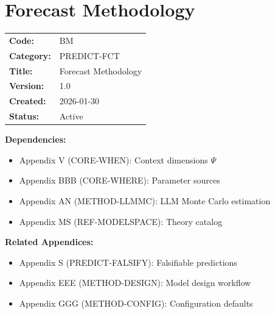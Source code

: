 
\chapter{Forecast Methodology}
\label{app:forecast-methodology}

\begin{tcolorbox}[colback=blue!5!white,colframe=blue!75!black,title=Appendix Metadata]
\begin{tabular}{ll}
\textbf{Code:} & BM \\
\textbf{Category:} & PREDICT-FCT \\
\textbf{Title:} & Forecast Methodology \\
\textbf{Version:} & 1.0 \\
\textbf{Created:} & 2026-01-30 \\
\textbf{Status:} & Active \\
\end{tabular}
\end{tcolorbox}

\begin{tcolorbox}[colback=gray!5!white,colframe=gray!75!black,title=Cross-Reference Map]
\textbf{Dependencies:}
\begin{itemize}
    \item Appendix V (CORE-WHEN): Context dimensions $\Psi$
    \item Appendix BBB (CORE-WHERE): Parameter sources
    \item Appendix AN (METHOD-LLMMC): LLM Monte Carlo estimation
    \item Appendix MS (REF-MODELSPACE): Theory catalog
\end{itemize}

\textbf{Related Appendices:}
\begin{itemize}
    \item Appendix S (PREDICT-FALSIFY): Falsifiable predictions
    \item Appendix EEE (METHOD-DESIGN): Model design workflow
    \item Appendix GGG (METHOD-CONFIG): Configuration defaults
\end{itemize}
\end{tcolorbox}

